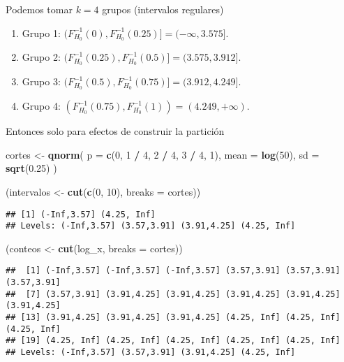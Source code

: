 \documentclass[
  12pt,
]{book}
\newenvironment{Shaded}{\begin{snugshade}}{\end{snugshade}}
\newcommand{\DataTypeTok}[1]{\textcolor[rgb]{0.13,0.29,0.53}{#1}}
\newcommand{\DecValTok}[1]{\textcolor[rgb]{0.00,0.00,0.81}{#1}}
\newcommand{\FloatTok}[1]{\textcolor[rgb]{0.00,0.00,0.81}{#1}}
\newcommand{\KeywordTok}[1]{\textcolor[rgb]{0.13,0.29,0.53}{\textbf{#1}}}
\newcommand{\NormalTok}[1]{#1}
\newcommand{\OperatorTok}[1]{\textcolor[rgb]{0.81,0.36,0.00}{\textbf{#1}}}
\newcommand{\StringTok}[1]{\textcolor[rgb]{0.31,0.60,0.02}{#1}}
\begin{document}
Podemos tomar \(k = 4\) grupos (intervalos regulares)

\begin{enumerate}
\def\labelenumi{\arabic{enumi}.}
\item
  Grupo 1: \((F^{-1}_{H_0}(0),F^{-1}_{H_0}(0.25)] = (-\infty,3.575]\).
\item
  Grupo 2: \((F^{-1}_{H_0}(0.25),F^{-1}_{H_0}(0.5)] = (3.575,3.912]\).
\item
  Grupo 3: \((F^{-1}_{H_0}(0.5),F^{-1}_{H_0}(0.75)]=(3.912,4.249]\).
\item
  Grupo 4: \((F^{-1}_{H_0}(0.75),F^{-1}_{H_0}(1))=(4.249,+\infty)\).
\end{enumerate}

Entonces solo para efectos de construir la partición

\begin{Shaded}
\begin{Highlighting}[]
\NormalTok{cortes \textless{}{-}}\StringTok{ }\KeywordTok{qnorm}\NormalTok{(}
  \DataTypeTok{p =} \KeywordTok{c}\NormalTok{(}\DecValTok{0}\NormalTok{, }\DecValTok{1} \OperatorTok{/}\StringTok{ }\DecValTok{4}\NormalTok{, }\DecValTok{2} \OperatorTok{/}\StringTok{ }\DecValTok{4}\NormalTok{, }\DecValTok{3} \OperatorTok{/}\StringTok{ }\DecValTok{4}\NormalTok{, }\DecValTok{1}\NormalTok{),}
  \DataTypeTok{mean =} \KeywordTok{log}\NormalTok{(}\DecValTok{50}\NormalTok{),}
  \DataTypeTok{sd =} \KeywordTok{sqrt}\NormalTok{(}\FloatTok{0.25}\NormalTok{)}
\NormalTok{)}

\NormalTok{(intervalos \textless{}{-}}\StringTok{ }\KeywordTok{cut}\NormalTok{(}\KeywordTok{c}\NormalTok{(}\DecValTok{0}\NormalTok{, }\DecValTok{10}\NormalTok{), }\DataTypeTok{breaks =}\NormalTok{ cortes))}
\end{Highlighting}
\end{Shaded}

\begin{verbatim}
## [1] (-Inf,3.57] (4.25, Inf]
## Levels: (-Inf,3.57] (3.57,3.91] (3.91,4.25] (4.25, Inf]
\end{verbatim}

\begin{Shaded}
\begin{Highlighting}[]
\NormalTok{(conteos \textless{}{-}}\StringTok{ }\KeywordTok{cut}\NormalTok{(log\_x, }\DataTypeTok{breaks =}\NormalTok{ cortes))}
\end{Highlighting}
\end{Shaded}

\begin{verbatim}
##  [1] (-Inf,3.57] (-Inf,3.57] (-Inf,3.57] (3.57,3.91] (3.57,3.91] (3.57,3.91]
##  [7] (3.57,3.91] (3.91,4.25] (3.91,4.25] (3.91,4.25] (3.91,4.25] (3.91,4.25]
## [13] (3.91,4.25] (3.91,4.25] (3.91,4.25] (4.25, Inf] (4.25, Inf] (4.25, Inf]
## [19] (4.25, Inf] (4.25, Inf] (4.25, Inf] (4.25, Inf] (4.25, Inf]
## Levels: (-Inf,3.57] (3.57,3.91] (3.91,4.25] (4.25, Inf]
\end{verbatim}
\end{document}
